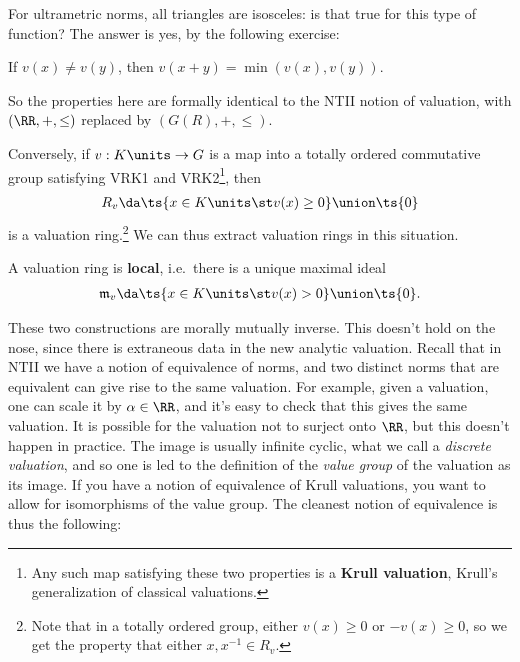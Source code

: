 For ultrametric norms, all triangles are isosceles: is that true for
this type of function? The answer is yes, by the following exercise:

\begin{exercise}[?]

If \(v(x) \neq v(y)\), then \(v(x+y) = \min(v(x), v(y))\).

\end{exercise}

So the properties here are formally identical to the NTII notion of
valuation, with \((\RR, +, \leq)\) replaced by \((G(R), +, \leq)\).

\begin{exercise}[?]

Conversely, if \(v: K\units \to G\) is a map into a totally ordered
commutative group satisfying VRK1 and VRK2\footnote{Any such map
  satisfying these two properties is a \textbf{Krull valuation}, Krull's
  generalization of classical valuations.}, then
\begin{align*}  
R_v \da \ts {x\in K\units \st v(x) \geq 0} \union \ts{0}
\end{align*} is a valuation ring.\footnote{Note that in a totally
  ordered group, either \(v(x) \geq 0\) or \(-v(x) \geq 0\), so we get
  the property that either \(x, x^{-1} \in R_v\).} We can thus extract
valuation rings in this situation.

\end{exercise}

\begin{exercise}[?]

A valuation ring is \textbf{local}, i.e.~there is a unique maximal ideal
\begin{align*}  
\mathfrak{m}_v \da \ts{x\in K\units \st v(x) > 0} \union \ts{0}
.\end{align*}

\end{exercise}

\begin{remark}

These two constructions are morally mutually inverse. This doesn't hold
on the nose, since there is extraneous data in the new analytic
valuation. Recall that in NTII we have a notion of equivalence of norms,
and two distinct norms that are equivalent can give rise to the same
valuation. For example, given a valuation, one can scale it by
\(\alpha \in \RR\), and it's easy to check that this gives the same
valuation. It is possible for the valuation not to surject onto \(\RR\),
but this doesn't happen in practice. The image is usually infinite
cyclic, what we call a \emph{discrete valuation}, and so one is led to
the definition of the \emph{value group} of the valuation as its image.
If you have a notion of equivalence of Krull valuations, you want to
allow for isomorphisms of the value group. The cleanest notion of
equivalence is thus the following:

\end{remark}

